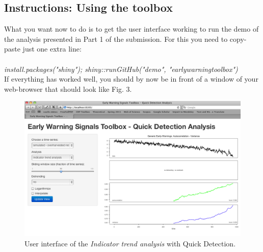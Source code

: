 \documentclass[12pt,a4paper,final]{article}
\begin{document}
\begin{doublespacing}
\section{Instructions: Using the toolbox}
What you want now to do is to get the user interface working to run the demo of the analysis presented in Part 1 of the submission. For this you need to copy-paste just one extra line:\\
\\
\textit{install.packages("shiny"); shiny::runGitHub("demo", "earlywarningtoolbox")}
\\

If everything has worked well, you should by now be in front of a window of your web-browser that should look like Fig. 3.
\newpage
\begin{figure}[ht]
\begin{center}
\includegraphics[scale=0.4]{demo_start.png}
\caption{User interface of the \textit{Indicator trend analysis} with Quick Detection.}
\end{center}
\end{figure}


\end{doublespacing}
\end{document}

